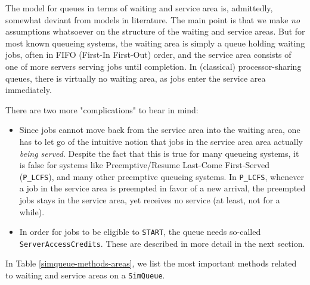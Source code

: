 The model for queues in terms of waiting and service area is,
  admittedly, somewhat deviant from models in literature.
The main point is that we make {\em no\/} assumptions
  whatsoever on the structure of the waiting and service areas.
But for most known queueing systems,
  the waiting area is simply a queue holding waiting jobs,
  often in FIFO (First-In First-Out) order,
  and the service area consists of one of more servers
  serving jobs until completion.
In (classical) processor-sharing queues,
  there is virtually no waiting area,
  as jobs enter the service area immediately.

There are two more "complications" to bear in mind:
\begin{itemize}
  \item Since jobs cannot move back from the service area
          into the waiting area,
          one has to let go of the intuitive notion that
          jobs in the service area area actually {\em being served}.
        Despite the fact that this is true for many queueing systems,
          it is false for systems like Preemptive/Resume Last-Come First-Served
          (\lstinline|P_LCFS|),
          and many other preemptive queueing systems.
        In \lstinline|P_LCFS|, whenever a job in the service area is preempted
          in favor of a new arrival,
          the preempted jobs stays in the service area,
          yet receives no service (at least, not for a while).
  \item In order for jobs to be eligible to \lstinline|START|,
          the queue needs so-called \lstinline|ServerAccessCredits|.
        These are described in more detail in the next section.
\end{itemize}

In Table \ref{simqueue-methods-areas},
  we list the most important methods related to waiting and service areas
  on a \lstinline|SimQueue|.

